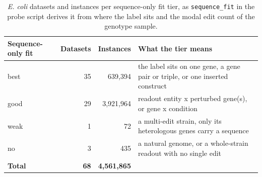 \begin{table}[H]
\centering
\footnotesize
\setlength{\tabcolsep}{4pt}
\caption{\emph{E. coli} datasets and instances per sequence-only fit tier, as \texttt{sequence\_fit} in the probe script derives it from where the label sits and the modal edit count of the genotype sample.}
\label{tab:tiers}
\begin{tabular}{@{}l r r >{\raggedright\arraybackslash}p{88mm}@{}}
\toprule
Sequence-only fit & Datasets & Instances & What the tier means \\
\midrule
best & 35 & 639,394 & the label sits on one gene, a gene pair or triple, or one inserted construct \\
good & 29 & 3,921,964 & readout entity x perturbed gene(s), or gene x condition \\
weak & 1 & 72 & a multi-edit strain, only its heterologous genes carry a sequence \\
no & 3 & 435 & a natural genome, or a whole-strain readout with no single edit \\
\midrule
\textbf{Total} & \textbf{68} & \textbf{4,561,865} &  \\
\bottomrule
\end{tabular}
\end{table}
